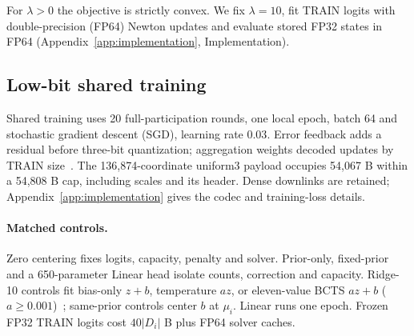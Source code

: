 For $\lambda>0$ the objective is strictly convex. We fix $\lambda=10$, fit TRAIN logits with double-precision (FP64) Newton updates and evaluate stored FP32 states in FP64 (Appendix~\ref{app:implementation}, Implementation).

\subsection{Low-bit shared training}
Shared training uses 20 full-participation rounds, one local epoch, batch 64 and stochastic gradient descent (SGD), learning rate $0.03$. Error feedback adds a residual before three-bit quantization; aggregation weights decoded updates by TRAIN size~\cite{karimireddy2019errorfeedback}. The 136,874-coordinate uniform3 payload occupies 54,067 B within a 54,808 B cap, including scales and its header. Dense downlinks are retained; Appendix~\ref{app:implementation} gives the codec and training-loss details.

\paragraph{Matched controls.}
Zero centering fixes logits, capacity, penalty and solver. Prior-only, fixed-prior and a 650-parameter Linear head isolate counts, correction and capacity. Ridge-10 controls fit bias-only $z+b$, temperature $az$, or eleven-value BCTS $az+b$ ($a\ge0.001$)~\cite{guo2017calibration,alexandari2020labelshift}; same-prior controls center $b$ at $\mu_i$. Linear runs one epoch. Frozen FP32 TRAIN logits cost $40|D_i|$ B plus FP64 solver caches.
